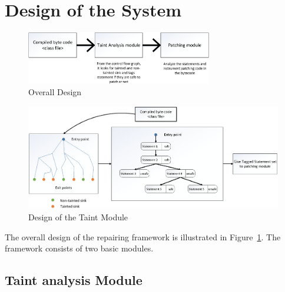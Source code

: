 \section{Design of the System}
\label{sec:SystemDesign}


\begin{figure}[t]
\centering
\includegraphics[width=3.2in]{images/OverallDesign.png}
\caption{Overall Design}
\label{fig:overallDesign}
\end{figure}


% 

\begin{figure}[t]
\centering
  \includegraphics[width= 7.0in]{images/TaintModule.png}
  \caption{Design of the Taint Module}
  \label{fig:TaintModule}
\end{figure}


The overall design of the repairing framework is illustrated in
Figure~\ref{fig:overallDesign}. The framework consists of two basic modules.


\subsection{Taint analysis Module}
\label{subsec:TaintModule}

